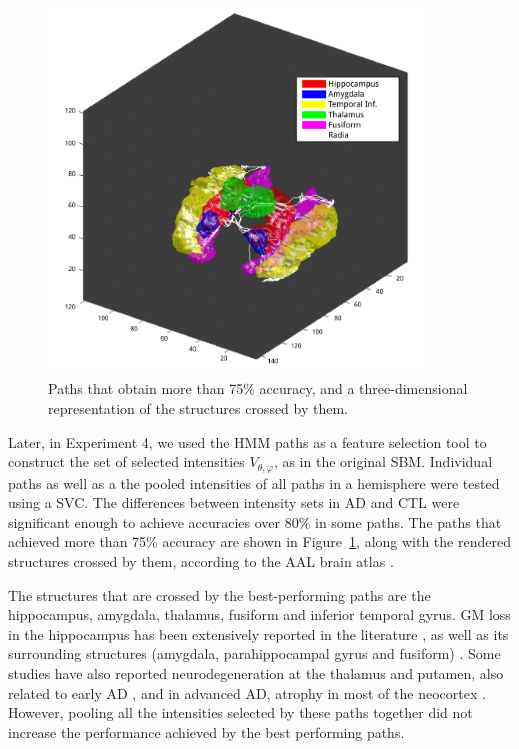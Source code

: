 \begin{figure}
	\begin{center}
		\includegraphics[width=0.9\textwidth]{Graphics/ch6/radia&structures}
		\caption{Paths that obtain more than 75\% accuracy, and a three-dimensional representation of the structures crossed by them.}
		\label{fig:bestPaths}
	\end{center}
\end{figure}

Later, in Experiment 4, we used the \ac{HMM} paths as a feature selection tool to construct the set of selected intensities $V_{\theta,\varphi}$, as in the original \ac{SBM}. Individual paths as well as a the pooled intensities of all paths in a hemisphere were tested using a \ac{SVC}. The differences between intensity sets in \ac{AD} and \ac{CTL} were significant enough to achieve accuracies over 80\% in some paths. The paths that achieved more than 75\% accuracy are shown in Figure~\ref{fig:bestPaths}, along with the rendered structures crossed by them, according to the \ac{AAL} brain atlas \cite{Tzourio-Mazoyer2002}. 

The structures that are crossed by the best-performing paths are the hippocampus, amygdala, thalamus, fusiform and inferior temporal gyrus. \ac{GM} loss in the hippocampus has been extensively reported in the literature \cite{Dubois2007,Baron2001,Jong2008}, as well as its surrounding structures (amygdala, parahippocampal gyrus and fusiform) \cite{Baron2001}. Some studies have also reported neurodegeneration at the thalamus and putamen, also related to early \ac{AD} \cite{Jong2008}, and in advanced \ac{AD}, atrophy in most of the neocortex \cite{Dubois2007,Baron2001,Jong2008}. However, pooling all the intensities selected by these paths together did not increase the performance achieved by the best performing paths. 

